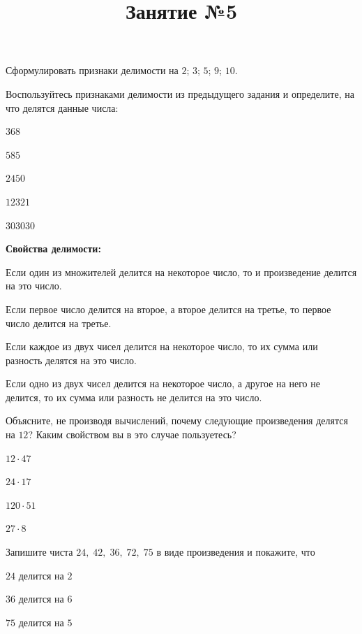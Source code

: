 \newpage
\title{Занятие №5}
\begin{listofex}
	\item Сформулировать признаки делимости на \( 2 \); \( 3 \); \( 5 \); \( 9 \); \( 10 \).
	\item Воспользуйтесь признаками делимости из предыдущего задания и определите, на что делятся данные числа:
	\begin{enumcols}[itemcolumns=5]
		\item \( 368 \)
		\item \( 585 \)
		\item \( 2450 \)
		\item \( 12321 \)
		\item \( 303030 \)
	\end{enumcols}
	\item \textbf{Свойства делимости:}
	\begin{enumcols}[itemcolumns=1]
		\item Если один из множителей делится на некоторое число, то и произведение делится на это число.
		\item Если первое число делится на второе, а второе делится на третье, то первое число делится на третье.
		\item Если каждое из двух чисел делится на некоторое число, то их сумма или разность делятся на это число.
		\item Если одно из двух чисел делится на некоторое число, а другое на него не делится, то их сумма или разность не делится на это число.
	\end{enumcols}
	\item Объясните, не производя вычислений, почему следующие произведения делятся на \( 12 \)? Каким свойством вы в это случае пользуетесь?
	\begin{enumcols}[itemcolumns=4]
		\item \( 12\cdot47 \)
		\item \( 24\cdot17 \)
		\item \( 120\cdot51 \)
		\item \( 27\cdot8 \)
	\end{enumcols}
	\item Запишите чиста \( 24,\;42,\;36,\;72,\;75 \) в виде произведения и покажите, что
	\begin{enumcols}[itemcolumns=3]
		\item \( 24 \) делится на \( 2 \)
		\item \( 36 \) делится на \( 6 \)
		\item \( 75 \) делится на \( 5 \)

\end{enumcols}
\end{listofex}
